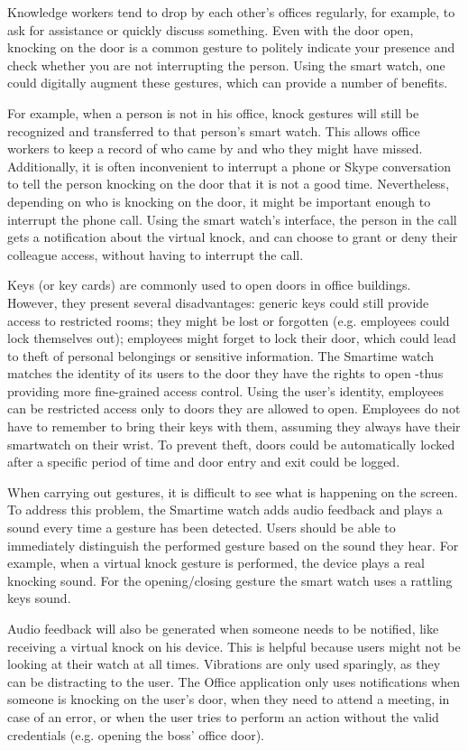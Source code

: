 \documentclass{article}
\begin{document}
Knowledge workers tend to drop by each other's offices regularly, for example, to ask for assistance or quickly discuss something. Even with the door open, knocking on the door is a common gesture to politely indicate your presence and check whether you are not interrupting the person. Using the smart watch, one could digitally augment these gestures, which can provide a number of benefits. 

For example, when a person is not in his office, knock gestures will still be recognized and transferred to that person's smart watch. This allows office workers to keep a record of who came by and who they might have missed. Additionally, it is often inconvenient to interrupt a phone or Skype conversation to tell the person knocking on the door that it is not a good time. Nevertheless, depending on who is knocking on the door, it might be important enough to interrupt the phone call. Using the smart watch's interface, the person in the call gets a notification about the virtual knock, and can choose to grant or deny their colleague access, without having to interrupt the call. 

Keys (or key cards) are commonly used to open doors in office buildings. However, they present several disadvantages: generic keys could still provide access to restricted rooms; they might be lost or forgotten (e.g. employees could lock themselves out); employees might forget to lock their door, which could lead to theft of personal belongings or sensitive information. The Smartime watch matches the identity of its users to the door they have the rights to open -thus providing more fine-grained access control. Using the user's identity, employees can be restricted access only to doors they are allowed to open. Employees do not have to remember to bring their keys with them, assuming they always have their smartwatch on their wrist. To prevent theft, doors could be automatically locked after a specific period of time and door entry and exit could be logged. 

When carrying out gestures, it is difficult to see what is happening on the screen. To address this problem, the Smartime watch adds audio feedback and plays a sound every time a gesture has been detected. Users should be able to immediately distinguish the performed gesture based on the sound they hear. For example, when a virtual knock gesture is performed, the device plays a real knocking sound. For the opening/closing gesture the smart watch uses a rattling keys sound.

Audio feedback will also be generated when someone needs to be notified, like receiving a virtual knock on his device. This is helpful because users might not be looking at their watch at all times. Vibrations are only used sparingly, as they can be distracting to the user. The Office application only uses notifications when someone is knocking on the user's door, when they need to attend a meeting, in case of an error, or when the user tries to perform an action without the valid credentials (e.g. opening the boss' office door). 
\end{document}
